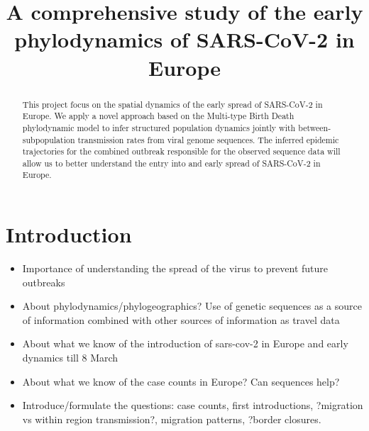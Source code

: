 \documentclass[12pt]{article}
\title{A comprehensive study of the early phylodynamics of SARS-CoV-2 in Europe}
\begin{document}
\maketitle

\begin{abstract}
This project focus on the spatial dynamics of the early spread of SARS-CoV-2 in Europe. We apply a novel approach based on the Multi-type Birth Death phylodynamic model to infer structured population dynamics jointly with between-subpopulation transmission rates from viral genome sequences. The inferred epidemic trajectories for the combined outbreak responsible for the observed sequence data will allow us to better understand the entry into and early spread of SARS-CoV-2 in Europe.

\end{abstract}


\section*{Introduction}

\begin{itemize}
\item Importance of understanding the spread of the virus to prevent future outbreaks 

\item About phylodynamics/phylogeographics? Use of genetic sequences as a source of information combined with other sources of information as travel data

\item About what we know of the introduction of sars-cov-2 in Europe and early dynamics till 8 March

\item About what we know of the case counts in Europe? Can sequences help?

\item Introduce/formulate the questions: case counts, first introductions, ?migration vs within region transmission?, migration patterns, ?border closures.
\end{itemize}
\end{document}
